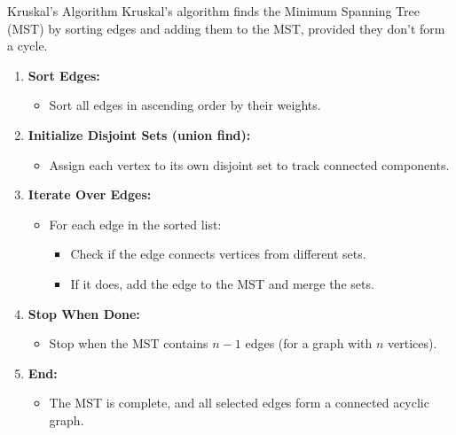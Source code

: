 \begin{usage}[]{Kruskal's Algorithm}
    Kruskal's algorithm finds the Minimum Spanning Tree (MST) by sorting edges and adding them to the MST, provided they don't form a cycle.

    \begin{enumerate}
        \item \textbf{Sort Edges:}
              \begin{itemize}
                  \item Sort all edges in ascending order by their weights.
              \end{itemize}

        \item \textbf{Initialize Disjoint Sets (union find):}
              \begin{itemize}
                  \item Assign each vertex to its own disjoint set to track connected components.
              \end{itemize}

        \item \textbf{Iterate Over Edges:}
              \begin{itemize}
                  \item For each edge in the sorted list:
                        \begin{itemize}
                            \item Check if the edge connects vertices from different sets.
                            \item If it does, add the edge to the MST and merge the sets.
                        \end{itemize}
              \end{itemize}

        \item \textbf{Stop When Done:}
              \begin{itemize}
                  \item Stop when the MST contains \(n-1\) edges (for a graph with \(n\) vertices).
              \end{itemize}

        \item \textbf{End:}
              \begin{itemize}
                  \item The MST is complete, and all selected edges form a connected acyclic graph.
              \end{itemize}
    \end{enumerate}
\end{usage}


